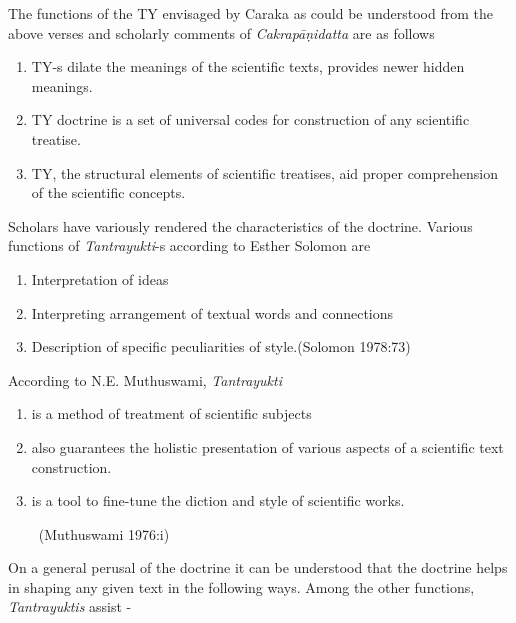 The functions of the TY envisaged by Caraka as could be understood from the above verses and scholarly comments of \textit{Cakrapāṇidatta} are as follows

\begin{enumerate}[{\rm a.}]
\itemsep=0pt
\item TY-s dilate the meanings of the scientific texts, provides newer hidden meanings.

 \item TY doctrine is a set of universal codes for construction of any scientific treatise.

 \item TY, the structural elements of scientific treatises, aid proper comprehension of the scientific concepts.

\end{enumerate}

Scholars have variously rendered the characteristics of the doctrine. Various functions of \textit{Tantrayukti}-s according to Esther Solomon are

\begin{enumerate}[{\rm a.}]
\itemsep=0pt
\item Interpretation of ideas

 \item Interpreting arrangement of textual words and connections

 \item Description of specific peculiarities of style.\hfill (Solomon 1978:73)

\end{enumerate}

According to N.E. Muthuswami, \textit{Tantrayukti}

\begin{enumerate}[{\rm i)}]
\itemsep=0pt
\item is a method of treatment of scientific subjects

 \item also guarantees the holistic presentation of various aspects of a scientific text construction.

 \item is a tool to fine-tune the diction and style of scientific works.

~\hfill (Muthuswami 1976:i)

\end{enumerate}

On a general perusal of the doctrine it can be understood that the doctrine helps in shaping any given text in the following ways. Among the other functions, \textit{Tantrayuktis} assist -

